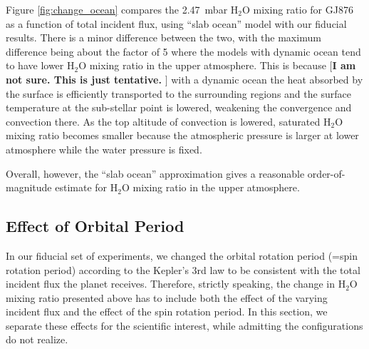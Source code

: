\documentclass[11pt,numberedappendix,twocolappendix,]{emulateapj}
\def\water{H$_2$O }
\def\preslevel{2.47}
\def\memo#1{\color{red}$[${\bf #1}$]$ \color{black}}
\begin{document}
Figure \ref{fig:change_ocean} compares the \preslevel ~mbar \water mixing ratio for GJ876 as a function of total incident flux, using ``slab ocean'' model with our fiducial results. 
There is a minor difference between the two, with the maximum difference being about the factor of 5 where the models with dynamic ocean tend to have lower \water mixing ratio in the upper atmosphere. 
This is because \memo{I am not sure. This is just tentative. } with a dynamic ocean the heat absorbed by the surface is efficiently transported to the surrounding regions and the surface temperature at the sub-stellar point is lowered, weakening the convergence and convection there.
As the top altitude of convection is lowered, saturated \water mixing ratio becomes smaller because the atmospheric pressure is larger at lower atmosphere while the water pressure is fixed. 

Overall, however, the ``slab ocean'' approximation gives a reasonable order-of-magnitude estimate for \water mixing ratio in the upper atmosphere. 

\subsection{Effect of Orbital Period}
\label{ss:sensitivity_Porbit}

In our fiducial set of experiments, we changed the orbital rotation period (=spin rotation period) according to the Kepler's 3rd law to be consistent with the total incident flux the planet receives. 
Therefore, strictly speaking, the change in \water mixing ratio presented above has to include both the effect of the varying incident flux and the effect of the spin rotation period. 
In this section, we separate these effects for the scientific interest, while admitting the configurations do not realize. 
\end{document}
